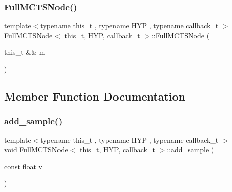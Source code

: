 \subsubsection{\texorpdfstring{Full\+M\+C\+T\+S\+Node()}{FullMCTSNode()}\hspace{0.1cm}{\footnotesize\ttfamily [5/5]}}
{\footnotesize\ttfamily template$<$typename this\+\_\+t , typename H\+YP , typename callback\+\_\+t $>$ \\
\hyperlink{class_full_m_c_t_s_node}{Full\+M\+C\+T\+S\+Node}$<$ this\+\_\+t, H\+YP, callback\+\_\+t $>$\+::\hyperlink{class_full_m_c_t_s_node}{Full\+M\+C\+T\+S\+Node} (\begin{DoxyParamCaption}\item[{this\+\_\+t \&\&}]{m }\end{DoxyParamCaption})\hspace{0.3cm}{\ttfamily [inline]}}



\subsection{Member Function Documentation}
\mbox{\label{class_full_m_c_t_s_node_a9c160f6b2732178bf7c2e32c125f4724}} 
\subsubsection{\texorpdfstring{add\+\_\+sample()}{add\_sample()}}
{\footnotesize\ttfamily template$<$typename this\+\_\+t , typename H\+YP , typename callback\+\_\+t $>$ \\
void \hyperlink{class_full_m_c_t_s_node}{Full\+M\+C\+T\+S\+Node}$<$ this\+\_\+t, H\+YP, callback\+\_\+t $>$\+::add\+\_\+sample (\begin{DoxyParamCaption}\item[{const float}]{v }\end{DoxyParamCaption})\hspace{0.3cm}{\ttfamily [inline]}}

\mbox{\label{class_full_m_c_t_s_node_aea09f6d9b8a5adfe97c81f698b718560}} 
